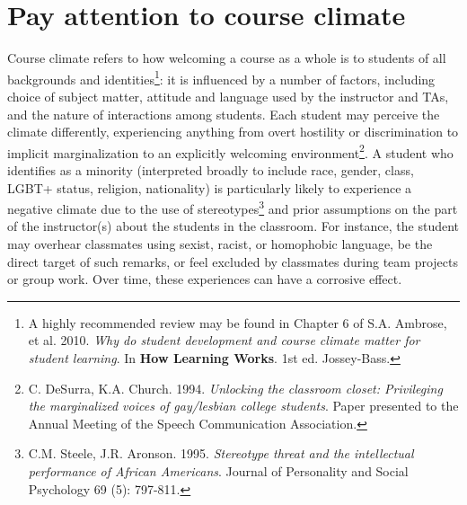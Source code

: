 \section {Pay attention to course climate}
\label{course-climate}
Course climate refers to how welcoming a course as a whole is to students of all backgrounds and identities\footnote{A highly recommended review may be found in Chapter 6 of S.A. Ambrose, et al. 2010. \emph{Why do student development and course climate matter for student learning}. In \textbf{How Learning Works}. 1st ed. Jossey-Bass.}: it is influenced by a number of factors, including choice of subject matter, attitude and language used by the instructor and TAs, and the nature of interactions among students. Each student may perceive the climate differently, experiencing anything from overt hostility or discrimination to implicit marginalization to an explicitly welcoming environment\footnote{C. DeSurra, K.A. Church. 1994. \emph{Unlocking the classroom closet: Privileging the marginalized voices of gay/lesbian college students}. Paper presented to the Annual Meeting of the Speech Communication Association.}. A student who identifies as a minority (interpreted broadly to include race, gender, class, LGBT+ status, religion, nationality) is particularly likely to experience a negative climate due to the use of stereotypes\footnote{C.M. Steele, J.R. Aronson. 1995. \emph{Stereotype threat and the intellectual performance of African Americans}. Journal of Personality and Social Psychology 69 (5): 797-811.} and prior assumptions on the part of the instructor(s) about the students in the classroom. For instance, the student may overhear classmates using sexist, racist, or homophobic language, be the direct target of such remarks, or feel excluded by classmates during team projects or group work. Over time, these experiences can have a corrosive effect.   %

